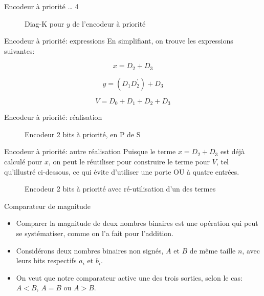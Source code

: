 \documentclass[presentation]{beamer}
\begin{document}
\begin{frame}[label={sec:org622d451}]{Encodeur à priorité \ldots{} 4}
\begin{figure}[htbp]
\centering

\caption{\label{fig:org58455f4}Diag-K pour \(y\) de l'encodeur à priorité}
\end{figure}
\end{frame}

\begin{frame}[label={sec:org4dd0aaf}]{Encodeur à priorité: expressions}
En simplifiant, on trouve les expressions suivantes:

$$ x = D_2 + D_3 $$

$$ y = (D_1 D_2^\prime) + D_3 $$

$$ V = D_0 + D_1 + D_2 + D_3 $$
\end{frame}

\begin{frame}[label={sec:orgcbce471}]{Encodeur à priorité: réalisation}
\begin{figure}[htbp]
\centering

\caption{\label{fig:org4d08016}Encodeur 2 bits à priorité, en P de S}
\end{figure}
\end{frame}

\begin{frame}[label={sec:orgb9d3b59}]{Encodeur à priorité: autre réalisation}
Puisque le terme \(x = D_2 + D_3\) est déjà calculé pour \(x\), on
peut le réutiliser pour construire le terme pour \(V\), tel
qu'illustré ci-dessous, ce qui évite d'utiliser une porte OU à quatre
entrées.

\begin{figure}[htbp]
\centering

\caption{\label{fig:orged7b0f2}Encodeur 2 bits à priorité avec ré-utilisation d'un des termes}
\end{figure}
\end{frame}

\begin{frame}[label={sec:orgab4def7}]{Comparateur de magnitude}
\begin{itemize}
\item Comparer la magnitude de deux nombres binaires est une opération qui peut se systématiser, comme on l'a fait pour l'addition.

\item Considérons deux nombres binaires non signés, \(A\) et \(B\) de même taille \(n\), avec leurs bits respectifs \(a_i\) et \(b_i\).

\item On veut que notre comparateur active une des trois sorties, selon le cas: \(A < B\), \(A = B\) ou \(A > B\).
\end{itemize}
\end{frame}
\end{document}
